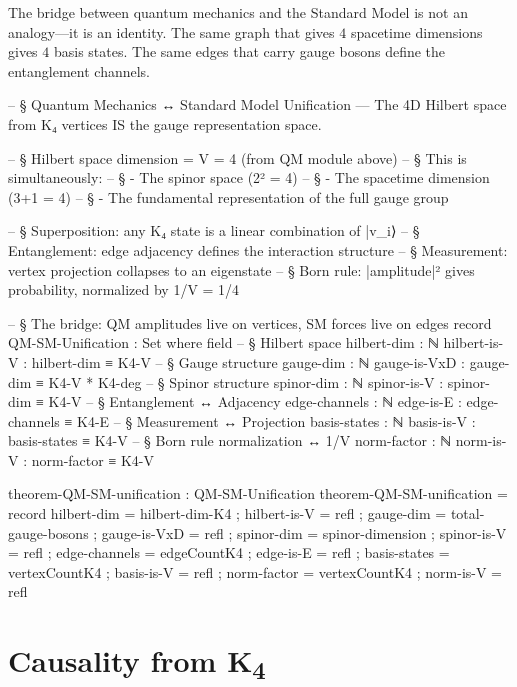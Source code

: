 \documentclass[11pt,a4paper]{book}
\begin{document}
The bridge between quantum mechanics and the Standard Model is not an analogy---it is an identity. The same graph that gives $4$ spacetime dimensions gives $4$ basis states. The same edges that carry gauge bosons define the entanglement channels.

\begin{code}
-- § Quantum Mechanics ↔ Standard Model Unification — The 4D Hilbert space from K₄ vertices IS the gauge representation space.

-- § Hilbert space dimension = V = 4 (from QM module above)
-- § This is simultaneously:
-- §   - The spinor space (2² = 4)
-- §   - The spacetime dimension (3+1 = 4)
-- §   - The fundamental representation of the full gauge group

-- § Superposition: any K₄ state is a linear combination of |v_i⟩
-- § Entanglement: edge adjacency defines the interaction structure
-- § Measurement: vertex projection collapses to an eigenstate
-- § Born rule: |amplitude|² gives probability, normalized by 1/V = 1/4

-- § The bridge: QM amplitudes live on vertices, SM forces live on edges
record QM-SM-Unification : Set where
  field
    -- § Hilbert space
    hilbert-dim       : ℕ
    hilbert-is-V      : hilbert-dim ≡ K4-V
    -- § Gauge structure
    gauge-dim         : ℕ
    gauge-is-VxD      : gauge-dim ≡ K4-V * K4-deg
    -- § Spinor structure
    spinor-dim        : ℕ
    spinor-is-V       : spinor-dim ≡ K4-V
    -- § Entanglement ↔ Adjacency
    edge-channels     : ℕ
    edge-is-E         : edge-channels ≡ K4-E
    -- § Measurement ↔ Projection
    basis-states      : ℕ
    basis-is-V        : basis-states ≡ K4-V
    -- § Born rule normalization ↔ 1/V
    norm-factor       : ℕ
    norm-is-V         : norm-factor ≡ K4-V

theorem-QM-SM-unification : QM-SM-Unification
theorem-QM-SM-unification = record
  { hilbert-dim   = hilbert-dim-K4
  ; hilbert-is-V  = refl
  ; gauge-dim     = total-gauge-bosons
  ; gauge-is-VxD  = refl
  ; spinor-dim    = spinor-dimension
  ; spinor-is-V   = refl
  ; edge-channels = edgeCountK4
  ; edge-is-E     = refl
  ; basis-states  = vertexCountK4
  ; basis-is-V    = refl
  ; norm-factor   = vertexCountK4
  ; norm-is-V     = refl }
\end{code}

\section{Causality from K\textsubscript{4}}
\label{sec:causality}
\end{document}
